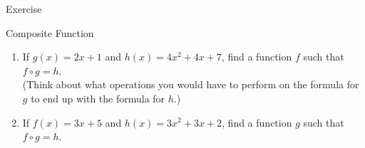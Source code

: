 \begin{frame}{Exercise}
    \begin{block}{Composite Function}
        \begin{enumerate}
            \item If $g(x)=2 x+1$ and $h(x)=4 x^{2}+4 x+7$, find a function $f$ such that $f \circ g=h$. \\(Think about what operations you would have to perform on the formula for $g$ to end up with the formula for $h$.)\\
            \item If $f(x)=3 x+5$ and $h(x)=3 x^{2}+3 x+2$, find a function $g$ such that $f \circ g=h$.\\
        \end{enumerate}
    \end{block}
\end{frame}

